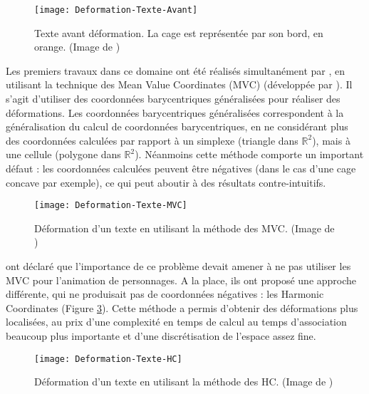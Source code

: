 \begin{figure}[ht]
\begin{center}
\texttt{[image: Deformation-Texte-Avant]}

\caption[Texte avant déformation] {Texte avant déformation. La cage est
représentée par son bord, en orange. (Image de \cite{LLC08})}

\label{DEFAva}
\end{center}
\end{figure}

Les premiers travaux dans ce domaine ont été réalisés simultanément par
\cite{JSW05} \cite{FKR05}, en utilisant la technique des Mean Value
Coordinates (MVC) (développée par \cite{Flo03}). Il s'agit d'utiliser des
coordonnées barycentriques généralisées pour réaliser des déformations. Les
coordonnées barycentriques généralisées correspondent à la généralisation du
calcul de coordonnées barycentriques, en ne considérant plus des coordonnées
calculées par rapport à un simplexe (triangle dans $\mathbb{R}^2$), mais à une
cellule (polygone dans $\mathbb{R}^2$). Néanmoins cette méthode comporte un
important défaut : les coordonnées calculées peuvent être négatives (dans le
cas d'une cage concave par exemple), ce qui peut aboutir à des résultats
contre-intuitifs.

\begin{figure}[ht]
\begin{center}
\texttt{[image: Deformation-Texte-MVC]}

\caption[Déformation d'un texte (MVC)] {Déformation d'un texte en utilisant la
méthode des MVC. (Image de \cite{LLC08})}

\label{DEFMea}
\end{center}
\end{figure}

\cite{JMDGS07} ont déclaré que l'importance de ce problème devait amener à ne
pas utiliser les MVC pour l'animation de personnages. A la place, ils ont
proposé une approche différente, qui ne produisait pas de coordonnées
négatives : les Harmonic Coordinates (Figure \ref{DEFHar}). Cette méthode a
permis d'obtenir des déformations plus localisées, au prix d'une complexité en
temps de calcul au temps d'association beaucoup plus importante et d'une
discrétisation de l'espace assez fine.

\begin{figure}[ht]
\begin{center}
\texttt{[image: Deformation-Texte-HC]}

\caption[Déformation d'un texte (HC)] {Déformation d'un texte en utilisant la
méthode des HC. (Image de \cite{LLC08})}

\label{DEFHar}
\end{center}
\end{figure}


